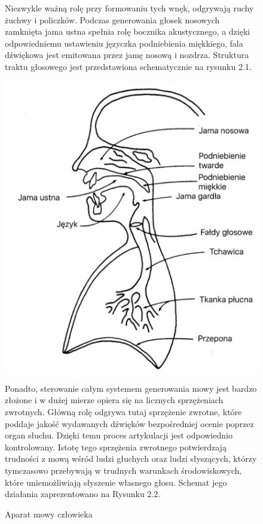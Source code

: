 \documentclass[eng,printmode]{mgr}
\begin{document}
\begin{figure}
	Niezwykle ważną rolę przy formowaniu tych wnęk, odgrywają ruchy żuchwy i policzków. Podczas generowania głosek nosowych zamknięta jama ustna spełnia rolę bocznika akustycznego, a dzięki odpowiedniemu ustawieniu języczka podniebienia miękkiego, fala dźwiękowa jest emitowana przez jamę nosową i nozdrza. Struktura traktu głosowego jest przedstawiona schematycznie na rysunku 2.1. \cite{Zemlin}
	\begin{center}
		\includegraphics[scale=0.25]{speechmechpl.png}
		\caption{Aparat mowy człowieka}\vspace{5mm}
	\end{center}

	 Ponadto, sterowanie całym systemem generowania mowy jest bardzo złożone i w dużej mierze opiera się na licznych sprzężeniach zwrotnych. Główną rolę odgrywa tutaj sprzężenie zwrotne, które poddaje jakość wydawanych dźwięków bezpośredniej ocenie poprzez organ słuchu. Dzięki temu proces artykulacji jest odpowiednio kontrolowany. Istotę tego sprzężenia zwrotnego potwierdzają trudności z mową wśród ludzi głuchych oraz ludzi słyszących, którzy tymczasowo przebywają w trudnych warunkach środowiskowych, które uniemożliwiają słyszenie własnego głosu. Schemat jego działania zaprezentowano na Rysunku 2.2.\vspace{5mm}
 

\end{figure}
\end{document}
